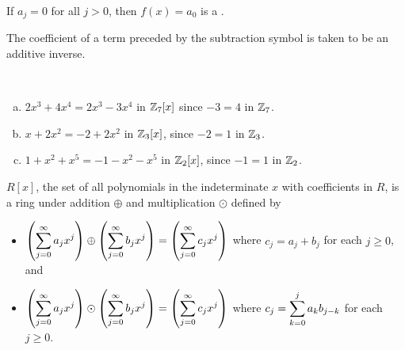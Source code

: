 \documentclass[11pt,fleqn,dvipsnames,usenames]{article}
\newcommand{\p}{\noindent}
\begin{document}
\terminology If $a_{j} = 0$ for all $j > 0$, then $f(x) = a_{0}$ is a .
\vsp

\p The coefficient of a term preceded by the subtraction symbol is taken to be an additive inverse.
\vsp

\begin{examples}~
\begin{enumerate}[(a)]
\item $2x^3 + 4x^4 = 2x^3 - 3x^4$ in $\mathbb{Z}_{7}[x]$ since $-3 = 4$ in $\mathbb{Z}_{7}$.
\item $x + 2x^2 = -2 + 2x^2$ in $\mathbb{Z}_{3}[x]$, since $-2 = 1$ in $\mathbb{Z}_{3}$.
\item $1 + x^2 + x^5 = -1 - x^2 - x^5$ in $\mathbb{Z}_{2}[x]$, since $-1 = 1$ in $\mathbb{Z}_{2}$.
\end{enumerate}
\end{examples}
\vsp

\begin{theorem}
$R[x]$, the set of all polynomials in the indeterminate $x$ with coefficients in $R$, is a ring under addition $\oplus$ and multiplication $\odot$ defined by
\begin{itemize}
\item $\left(\displaystyle\sum\limits_{j=0}^{\infty}a_{j}x^{j}\right)\oplus\left(\displaystyle\sum\limits_{j=0}^{\infty}b_{j}x^{j}\right) =\left(\displaystyle\sum\limits_{j=0}^{\infty}c_{j}x^{j}\right)$ where $c_{j} = a_{j} + b_{j}$ for each $j\geq 0$, and
\item $\left(\displaystyle\sum\limits_{j=0}^{\infty}a_{j}x^{j}\right)\odot\left(\displaystyle\sum\limits_{j=0}^{\infty}b_{j}x^{j}\right) =\left(\displaystyle\sum\limits_{j=0}^{\infty}c_{j}x^{j}\right)$ where
$c_{j} = \displaystyle\sum\limits_{k=0}^{j}a_{k}b_{j-k}$ for each $j\geq 0$.
\end{itemize}
\end{theorem}
\vsp
\end{document}
